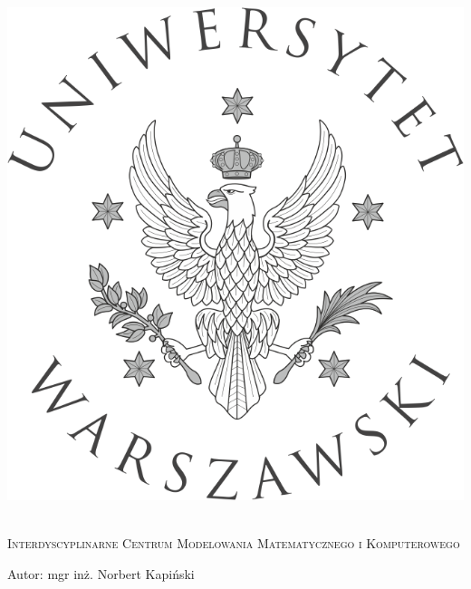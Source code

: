 
\newpage
\thispagestyle{empty}



\begin{onehalfspacing}
\begin{center}

\centering
\includegraphics[keepaspectratio,scale=0.9]{./figures/Logo-UW.jpg} \\[.5cm]


{\fontsize{17}{17}\selectfont
\textsc{ \\[.3cm]
Interdyscyplinarne Centrum Modelowania Matematycznego i Komputerowego  \\[0.5cm]
}

\large
{Autor: mgr inż. Norbert Kapiński  \\[1.7cm]}


}
\end{center}
\end{onehalfspacing}
